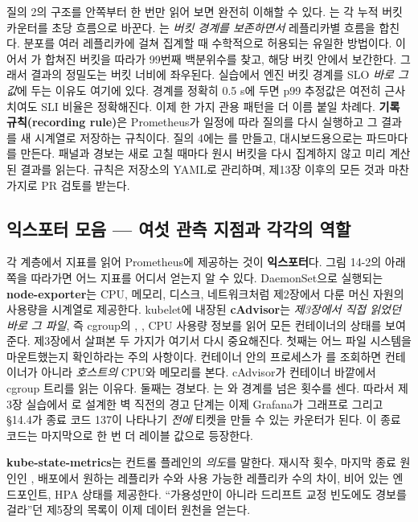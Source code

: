 질의 2의 구조를 안쪽부터 한 번만 읽어 보면 완전히 이해할 수 있다. 는 각 누적 버킷 카운터를 초당 흐름으로 바꾼다. 는 \textit{버킷 경계를 보존하면서} 레플리카별 흐름을 합친다. 분포를 여러 레플리카에 걸쳐 집계할 때 수학적으로 허용되는 유일한 방법이다. 이어서 가 합쳐진 버킷을 따라가 99번째 백분위수를 찾고, 해당 버킷 안에서 보간한다. 그래서 결과의 정밀도는 버킷 너비에 좌우된다. 실습에서 엔진 버킷 경계를 SLO \textit{바로 그 값}에 두는 이유도 여기에 있다. 경계를 정확히 0.5 s에 두면 p99 추정값은 여전히 근사치여도 SLI 비율은 정확해진다. 이제 한 가지 관용 패턴을 더 이름 붙일 차례다. \textbf{기록 규칙(recording rule)}은 Prometheus가 일정에 따라 질의를 다시 실행하고 그 결과를 새 시계열로 저장하는 규칙이다. 질의 4에는 를 만들고, 대시보드용으로는 파드마다 를 만든다. 패널과 경보는 새로 고칠 때마다 원시 버킷을 다시 집계하지 않고 미리 계산된 결과를 읽는다. 규칙은 저장소의 YAML로 관리하며, 제13장 이후의 모든 것과 마찬가지로 PR 검토를 받는다.

\subsection*{익스포터 모음 — 여섯 관측 지점과 각각의 역할}

각 계층에서 지표를 읽어 Prometheus에 제공하는 것이 \textbf{익스포터}다. 그림 14-2의 아래쪽을 따라가면 어느 지표를 어디서 얻는지 알 수 있다. DaemonSet으로 실행되는 \textbf{node-exporter}는 CPU, 메모리, 디스크, 네트워크처럼 제2장에서 다룬 머신 자원의 사용량을 시계열로 제공한다. kubelet에 내장된 \textbf{cAdvisor}는 \textit{제3장에서 직접 읽었던 바로 그 파일}, 즉 cgroup의 , , CPU 사용량 정보를 읽어 모든 컨테이너의 상태를 보여 준다. 제3장에서 살펴본 두 가지가 여기서 다시 중요해진다. 첫째는 어느 파일 시스템을 마운트했는지 확인하라는 주의 사항이다. 컨테이너 안의 프로세스가 를 조회하면 컨테이너가 아니라 \textit{호스트의} CPU와 메모리를 본다. cAdvisor가 컨테이너 바깥에서 cgroup 트리를 읽는 이유다. 둘째는 경보다. 는 와  경계를 넘은 횟수를 센다. 따라서 제3장 실습에서 로 설계한 벽 직전의 경고 단계는 이제 Grafana가 그래프로 그리고 §14.4가 종료 코드 137이 나타나기 \textit{전에} 티켓을 만들 수 있는 카운터가 된다. 이 종료 코드는 마지막으로 한 번 더 레이블 값으로 등장한다.

\textbf{kube-state-metrics}는 컨트롤 플레인의 \textit{의도}를 말한다. 재시작 횟수, 마지막 종료 원인인 , 배포에서 원하는 레플리카 수와 사용 가능한 레플리카 수의 차이, 비어 있는 엔드포인트, HPA 상태를 제공한다. “가용성만이 아니라 드리프트 교정 빈도에도 경보를 걸라”던 제5장의 목록이 이제 데이터 원천을 얻는다.

